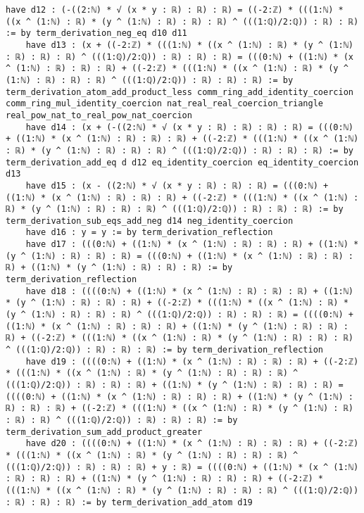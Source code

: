 \documentclass{article}
\begin{document}
\begin{tcolorbox}[colback=white!10, width=\linewidth]
\begin{lstlisting}[language=Lean4]
    have d12 : (-((2:ℕ) * √ (x * y : ℝ) : ℝ) : ℝ) = ((-2:ℤ) * (((1:ℕ) * ((x ^ (1:ℕ) : ℝ) * (y ^ (1:ℕ) : ℝ) : ℝ) : ℝ) ^ (((1:ℚ)/2:ℚ)) : ℝ) : ℝ) := by term_derivation_neg_eq d10 d11
    have d13 : (x + ((-2:ℤ) * (((1:ℕ) * ((x ^ (1:ℕ) : ℝ) * (y ^ (1:ℕ) : ℝ) : ℝ) : ℝ) ^ (((1:ℚ)/2:ℚ)) : ℝ) : ℝ) : ℝ) = (((0:ℕ) + ((1:ℕ) * (x ^ (1:ℕ) : ℝ) : ℝ) : ℝ) + ((-2:ℤ) * (((1:ℕ) * ((x ^ (1:ℕ) : ℝ) * (y ^ (1:ℕ) : ℝ) : ℝ) : ℝ) ^ (((1:ℚ)/2:ℚ)) : ℝ) : ℝ) : ℝ) := by term_derivation_atom_add_product_less comm_ring_add_identity_coercion comm_ring_mul_identity_coercion nat_real_real_coercion_triangle real_pow_nat_to_real_pow_nat_coercion
    have d14 : (x + (-((2:ℕ) * √ (x * y : ℝ) : ℝ) : ℝ) : ℝ) = (((0:ℕ) + ((1:ℕ) * (x ^ (1:ℕ) : ℝ) : ℝ) : ℝ) + ((-2:ℤ) * (((1:ℕ) * ((x ^ (1:ℕ) : ℝ) * (y ^ (1:ℕ) : ℝ) : ℝ) : ℝ) ^ (((1:ℚ)/2:ℚ)) : ℝ) : ℝ) : ℝ) := by term_derivation_add_eq d d12 eq_identity_coercion eq_identity_coercion d13
    have d15 : (x - ((2:ℕ) * √ (x * y : ℝ) : ℝ) : ℝ) = (((0:ℕ) + ((1:ℕ) * (x ^ (1:ℕ) : ℝ) : ℝ) : ℝ) + ((-2:ℤ) * (((1:ℕ) * ((x ^ (1:ℕ) : ℝ) * (y ^ (1:ℕ) : ℝ) : ℝ) : ℝ) ^ (((1:ℚ)/2:ℚ)) : ℝ) : ℝ) : ℝ) := by term_derivation_sub_eqs_add_neg d14 neg_identity_coercion
    have d16 : y = y := by term_derivation_reflection
    have d17 : (((0:ℕ) + ((1:ℕ) * (x ^ (1:ℕ) : ℝ) : ℝ) : ℝ) + ((1:ℕ) * (y ^ (1:ℕ) : ℝ) : ℝ) : ℝ) = (((0:ℕ) + ((1:ℕ) * (x ^ (1:ℕ) : ℝ) : ℝ) : ℝ) + ((1:ℕ) * (y ^ (1:ℕ) : ℝ) : ℝ) : ℝ) := by term_derivation_reflection
    have d18 : ((((0:ℕ) + ((1:ℕ) * (x ^ (1:ℕ) : ℝ) : ℝ) : ℝ) + ((1:ℕ) * (y ^ (1:ℕ) : ℝ) : ℝ) : ℝ) + ((-2:ℤ) * (((1:ℕ) * ((x ^ (1:ℕ) : ℝ) * (y ^ (1:ℕ) : ℝ) : ℝ) : ℝ) ^ (((1:ℚ)/2:ℚ)) : ℝ) : ℝ) : ℝ) = ((((0:ℕ) + ((1:ℕ) * (x ^ (1:ℕ) : ℝ) : ℝ) : ℝ) + ((1:ℕ) * (y ^ (1:ℕ) : ℝ) : ℝ) : ℝ) + ((-2:ℤ) * (((1:ℕ) * ((x ^ (1:ℕ) : ℝ) * (y ^ (1:ℕ) : ℝ) : ℝ) : ℝ) ^ (((1:ℚ)/2:ℚ)) : ℝ) : ℝ) : ℝ) := by term_derivation_reflection
    have d19 : ((((0:ℕ) + ((1:ℕ) * (x ^ (1:ℕ) : ℝ) : ℝ) : ℝ) + ((-2:ℤ) * (((1:ℕ) * ((x ^ (1:ℕ) : ℝ) * (y ^ (1:ℕ) : ℝ) : ℝ) : ℝ) ^ (((1:ℚ)/2:ℚ)) : ℝ) : ℝ) : ℝ) + ((1:ℕ) * (y ^ (1:ℕ) : ℝ) : ℝ) : ℝ) = ((((0:ℕ) + ((1:ℕ) * (x ^ (1:ℕ) : ℝ) : ℝ) : ℝ) + ((1:ℕ) * (y ^ (1:ℕ) : ℝ) : ℝ) : ℝ) + ((-2:ℤ) * (((1:ℕ) * ((x ^ (1:ℕ) : ℝ) * (y ^ (1:ℕ) : ℝ) : ℝ) : ℝ) ^ (((1:ℚ)/2:ℚ)) : ℝ) : ℝ) : ℝ) := by term_derivation_sum_add_product_greater
    have d20 : ((((0:ℕ) + ((1:ℕ) * (x ^ (1:ℕ) : ℝ) : ℝ) : ℝ) + ((-2:ℤ) * (((1:ℕ) * ((x ^ (1:ℕ) : ℝ) * (y ^ (1:ℕ) : ℝ) : ℝ) : ℝ) ^ (((1:ℚ)/2:ℚ)) : ℝ) : ℝ) : ℝ) + y : ℝ) = ((((0:ℕ) + ((1:ℕ) * (x ^ (1:ℕ) : ℝ) : ℝ) : ℝ) + ((1:ℕ) * (y ^ (1:ℕ) : ℝ) : ℝ) : ℝ) + ((-2:ℤ) * (((1:ℕ) * ((x ^ (1:ℕ) : ℝ) * (y ^ (1:ℕ) : ℝ) : ℝ) : ℝ) ^ (((1:ℚ)/2:ℚ)) : ℝ) : ℝ) : ℝ) := by term_derivation_add_atom d19

\end{lstlisting}
\end{tcolorbox}
\end{document}
